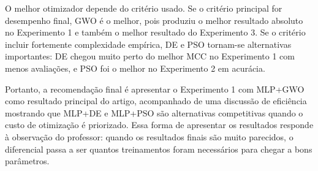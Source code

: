 \documentclass[12pt,a4paper]{article}
\begin{document}
O melhor otimizador depende do critério usado. Se o critério principal for desempenho final, GWO é o melhor, pois produziu o melhor resultado absoluto no Experimento 1 e também o melhor resultado do Experimento 3. Se o critério incluir fortemente complexidade empírica, DE e PSO tornam-se alternativas importantes: DE chegou muito perto do melhor MCC no Experimento 1 com menos avaliações, e PSO foi o melhor no Experimento 2 em acurácia.

Portanto, a recomendação final é apresentar o Experimento 1 com MLP+GWO como resultado principal do artigo, acompanhado de uma discussão de eficiência mostrando que MLP+DE e MLP+PSO são alternativas competitivas quando o custo de otimização é priorizado. Essa forma de apresentar os resultados responde à observação do professor: quando os resultados finais são muito parecidos, o diferencial passa a ser quantos treinamentos foram necessários para chegar a bons parâmetros.
\end{document}
